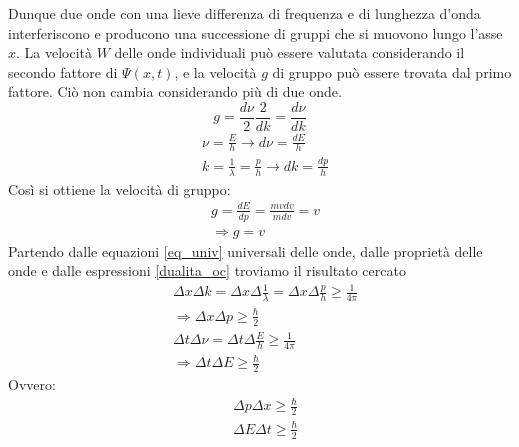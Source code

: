 Dunque due onde con una lieve differenza di frequenza e di lunghezza d'onda interferiscono e producono una successione di gruppi che si muovono lungo l'asse $x$.
La velocità $W$ delle onde individuali può essere valutata considerando il secondo fattore di $\Psi (x, t)$, e la velocità $g$ di gruppo può essere trovata dal primo fattore.
Ciò non cambia considerando più di due onde.
$$ g = \frac{d\nu}{2}\frac{2}{dk} = \frac{d\nu}{dk} $$
\begin{equation}
\begin{split}
& \nu= \frac{E}{h} \rightarrow d\nu = \frac{d E}{h} \\
& k = \frac{1}{\lambda} = \frac{p}{h} \rightarrow dk=\frac{d p}{h}
\end{split}
\end{equation}
Così si ottiene la velocità di gruppo: 
\begin{equation}
\begin{split}
& g = \frac{d E}{d p} = \frac{m v dv}{m dv} = v \\
& \Rightarrow g = v
\end{split}
\end{equation}
Partendo dalle equazioni \ref{eq_univ} universali delle onde, dalle proprietà delle onde e dalle espressioni \ref{dualita_oc} troviamo il risultato cercato
\begin{equation}
\begin{split}
& \Delta x \Delta k = \Delta x \Delta \frac{1}{\lambda} = \Delta x \Delta \frac{p}{h}  \ge \frac{1}{4\pi} \\
& \Rightarrow \Delta x \Delta p \ge \frac{\hbar}{2} \\
& \Delta t \Delta \nu = \Delta t \Delta \frac{E}{h} \ge \frac{1}{4\pi} \\
& \Rightarrow \Delta t \Delta E \ge \frac{\hbar}{2}
\end{split}
\end{equation}
Ovvero:
\begin{equation}
\begin{split}
& \Delta p \Delta x \ge \frac{\hbar}{2} \\
& \Delta E \Delta t \ge \frac{\hbar}{2}
\end{split}
\end{equation}






